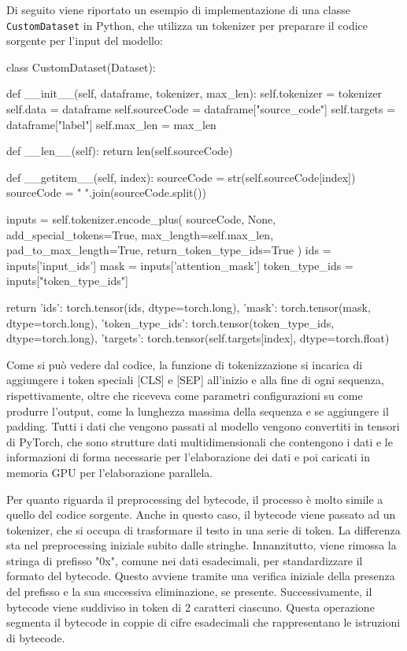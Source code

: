 \documentclass[../../Thesis.tex]{subfiles}
\begin{document}
Di seguito viene riportato un esempio di implementazione di una classe \texttt{CustomDataset} in Python, che utilizza un tokenizer per preparare il codice sorgente per l'input del modello:

\begin{python}
class CustomDataset(Dataset):

    def __init__(self, dataframe, tokenizer, max_len):
        self.tokenizer = tokenizer
        self.data = dataframe
        self.sourceCode = dataframe["source_code"]
        self.targets = dataframe["label"]
        self.max_len = max_len

    def __len__(self):
        return len(self.sourceCode)

    def __getitem__(self, index):
        sourceCode = str(self.sourceCode[index])
        sourceCode = " ".join(sourceCode.split())

        inputs = self.tokenizer.encode_plus(
            sourceCode,
            None,
            add_special_tokens=True,
            max_length=self.max_len,
            pad_to_max_length=True,
            return_token_type_ids=True
        )
        ids = inputs['input_ids']
        mask = inputs['attention_mask']
        token_type_ids = inputs["token_type_ids"]

        return {
            'ids': torch.tensor(ids, dtype=torch.long),
            'mask': torch.tensor(mask, dtype=torch.long),
            'token_type_ids': torch.tensor(token_type_ids, dtype=torch.long),
            'targets': torch.tensor(self.targets[index], dtype=torch.float)
        }
\end{python}

Come si può vedere dal codice, la funzione di tokenizzazione si incarica di aggiungere i token speciali [CLS] e [SEP] all'inizio e alla fine di ogni sequenza, rispettivamente, oltre che riceveva come parametri configurazioni su come produrre l'output, come la lunghezza massima della sequenza e se aggiungere il padding. Tutti i dati che vengono passati al modello vengono convertiti in tensori di PyTorch, che sono strutture dati multidimensionali che contengono i dati e le informazioni di forma necessarie per l'elaborazione dei dati e poi caricati in memoria GPU per l'elaborazione parallela.

Per quanto riguarda il preprocessing del bytecode, il processo è molto simile a quello del codice sorgente. Anche in questo caso, il bytecode viene passato ad un tokenizer, che si occupa di trasformare il testo in una serie di token. La differenza sta nel preprocessing iniziale subito dalle stringhe. Innanzitutto, viene rimossa la stringa di prefisso "0x", comune nei dati esadecimali, per standardizzare il formato del bytecode. Questo avviene tramite una verifica iniziale della presenza del prefisso e la sua successiva eliminazione, se presente. Successivamente, il bytecode viene suddiviso in token di 2 caratteri ciascuno. Questa operazione segmenta il bytecode in coppie di cifre esadecimali che rappresentano le istruzioni di bytecode.
\end{document}
